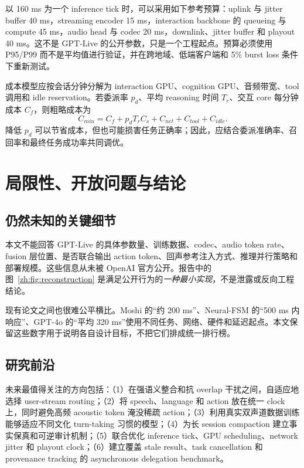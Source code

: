 \documentclass[UTF8,fontset=none,a4paper,10pt]{ctexart}
\begin{document}
以 160 ms 为一个 inference tick 时，可以采用如下参考预算：uplink 与 jitter buffer 40 ms，streaming encoder 15 ms，interaction backbone 的 queueing 与 compute 45 ms，audio head 与 codec 20 ms，downlink、jitter buffer 和 playout 40 ms。这不是 GPT-Live 的公开参数，只是一个工程起点。预算必须使用 P95/P99 而不是平均值进行验证，并在跨地域、低端客户端和 5\% burst loss 条件下重新测试。

成本模型应按会话分钟分解为 interaction GPU、cognition GPU、音频带宽、tool 调用和 idle reservation。若委派率 $p_d$、平均 reasoning 时间 $T_r$、交互 core 每分钟成本 $C_f$，则粗略成本为
\begin{equation}
C_{min}=C_f+p_dT_rC_s+C_{net}+C_{tool}+C_{idle}.
\end{equation}
降低 $p_d$ 可以节省成本，但也可能损害任务正确率；因此，应结合委派准确率、召回率和最终任务成功率共同调优。

\section{局限性、开放问题与结论}

\subsection{仍然未知的关键细节}

本文不能回答 GPT-Live 的具体参数量、训练数据、codec、audio token rate、fusion 层位置、是否联合输出 action token、回声参考注入方式、推理并行策略和部署规模。这些信息从未被 OpenAI 官方公开。报告中的图~\ref{zh:fig:reconstruction} 是满足公开行为的\emph{一种最小实现}，不是泄露或反向工程结论。

现有论文之间也很难公平横比。Moshi 的“约 200 ms”、Neural-FSM 的“500 ms 内响应”、GPT-4o 的“平均 320 ms”使用不同任务、网络、硬件和延迟起点。本文保留这些数字用于说明各自设计目标，不把它们排成统一排行榜。

\subsection{研究前沿}

未来最值得关注的方向包括：（1）在强语义整合和抗 overlap 干扰之间，自适应地选择 user-stream routing；（2）将 speech、language 和 action 放在统一 clock 上，同时避免高频 acoustic token 淹没稀疏 action；（3）利用真实双声道数据训练能够适应不同文化 turn-taking 习惯的模型；（4）为长 session compaction 建立事实保真和可逆审计机制；（5）联合优化 inference tick、GPU scheduling、network jitter 和 playout clock；（6）建立覆盖 stale result、task cancellation 和 provenance tracking 的 asynchronous delegation benchmark。
\end{document}
